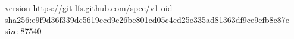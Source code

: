 version https://git-lfs.github.com/spec/v1
oid sha256:e9f9d36f339dc5619ccd9c26be801cd05c4cd25e335ad81363df9ce9efb8c87e
size 87540
